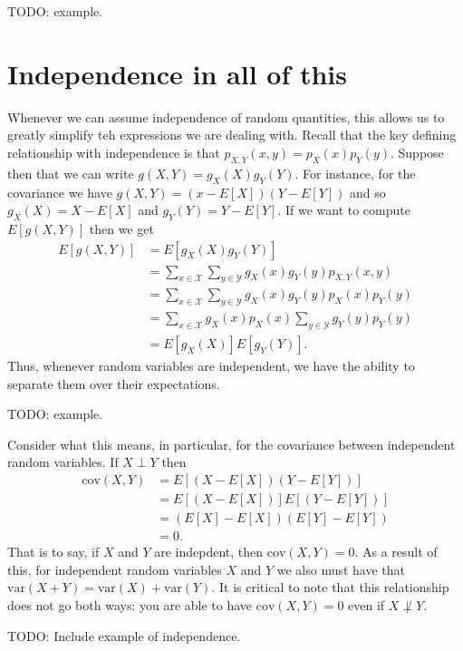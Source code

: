 \documentclass[
  letterpaper,
  DIV=11,
  numbers=noendperiod]{scrreprt}
\begin{document}
TODO: example.

\section{Independence in all of this}\label{independence-in-all-of-this}

Whenever we can assume independence of random quantities, this allows us
to greatly simplify teh expressions we are dealing with. Recall that the
key defining relationship with independence is that
\(p_{X,Y}(x,y) = p_X(x)p_Y(y)\). Suppose then that we can write
\(g(X,Y) = g_X(X)g_Y(Y)\). For instance, for the covariance we have
\(g(X,Y)=(x-E[X])(Y-E[Y])\) and so \(g_X(X) = X-E[X]\) and
\(g_Y(Y) = Y-E[Y]\). If we want to compute \(E[g(X,Y)]\) then we get
\begin{align*}
E[g(X,Y)] &= E[g_X(X)g_Y(Y)] \\
&= \sum_{x\in\mathcal{X}}\sum_{y\in\mathcal{Y}}g_X(x)g_Y(y)p_{X,Y}(x,y) \\
&= \sum_{x\in\mathcal{X}}\sum_{y\in\mathcal{Y}}g_X(x)g_Y(y)p_X(x)p_Y(y) \\
&=\sum_{x\in\mathcal{X}}g_X(x)p_X(x)\sum_{y\in\mathcal{Y}}g_Y(y)p_Y(y)\\
&= E[g_X(X)]E[g_Y(Y)].\end{align*} Thus, whenever random variables are
independent, we have the ability to separate them over their
expectations.

TODO: example.

Consider what this means, in particular, for the covariance between
independent random variables. If \(X\perp Y\) then \begin{align*}
\text{cov}(X,Y) &= E[(X-E[X])(Y-E[Y])] \\
&= E[(X-E[X])]E[(Y-E[Y])] \\
&= (E[X]-E[X])(E[Y]-E[Y]) \\
&= 0.\end{align*} That is to say, if \(X\) and \(Y\) are indepdent, then
\(\text{cov}(X,Y)=0\). As a result of this, for independent random
variables \(X\) and \(Y\) we also must have that
\(\text{var}(X+Y)=\text{var}(X)+\text{var}(Y)\). It is critical to note
that this relationship does not go both ways: you are able to have
\(\text{cov}(X,Y) = 0\) even if \(X\not\perp Y\).

TODO: Include example of independence.
\end{document}
